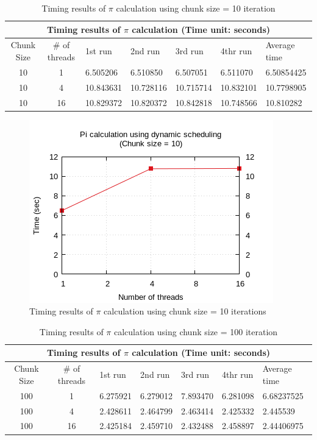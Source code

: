 \documentclass{article}
\begin{document}

\begin{table}[htbp]
  \centering
    \begin{tabular}{|c c||l l l l| l|} 
    \hline
    \multicolumn{7}{|c|}{Timing results of $\pi$ calculation (Time unit: seconds)} \\
    \hline
    Chunk Size & \# of threads & 1st run & 2nd run & 3rd run & 4thr run & Average time\\ [0.5ex] 
    \hline\hline
    10 & 1 & 6.505206 & 6.510850 & 6.507051 & 6.511070 & 6.50854425 \\
    \hline
    10 & 4 & 10.843631 & 10.728116 & 10.715714 & 10.832101 & 10.7798905 \\
    \hline
    10 & 16 & 10.829372 & 10.820372 & 10.842818 & 10.748566 & 10.810282 \\ [1ex]
    \hline
    \end{tabular}
  \caption{Timing results of $\pi$ calculation using chunk size = 10 iteration}
\end{table}

\begin{figure}[htbp]
  \centering
  \includegraphics[width=0.55\columnwidth]{../ex1/plots/pi_c10.png}
  \caption{Timing results of $\pi$ calculation using chunk size = 10 iterations}
\end{figure}


\begin{table}[htbp]
  \centering
    \begin{tabular}{|c c||l l l l| l|} 
    \hline
    \multicolumn{7}{|c|}{Timing results of $\pi$ calculation (Time unit: seconds)} \\
    \hline
    Chunk Size & \# of threads & 1st run & 2nd run & 3rd run & 4thr run & Average time\\ [0.5ex] 
    \hline\hline
    100 & 1 & 6.275921 & 6.279012 & 7.893470 & 6.281098 & 6.68237525 \\
    \hline
    100 & 4 & 2.428611 & 2.464799 & 2.463414 & 2.425332 & 2.445539 \\
    \hline
    100 & 16 & 2.425184 & 2.459710 & 2.432488 & 2.458897 & 2.44406975 \\ [1ex]
    \hline
    \end{tabular}
  \caption{Timing results of $\pi$ calculation using chunk size = 100 iteration}
\end{table}
\end{document}
